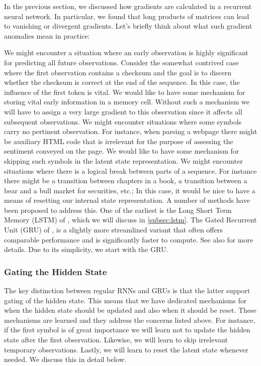 In the previous section, we discussed how gradients are calculated in a recurrent neural network. In particular, we found that long products of matrices can lead to vanishing or divergent gradients. Let’s briefly think about what such gradient anomalies mean in practice:

We might encounter a situation where an early observation is highly significant for predicting all future observations. Consider the somewhat contrived case where the first observation contains a checksum and the goal is to discern whether the checksum is correct at the end of the sequence. In this case, the influence of the first token is vital. We would like to have some mechanism for storing vital early information in a memory cell. Without such a mechanism we will have to assign a very large gradient to this observation since it affects all subsequent observations.
We might encounter situations where some symbols carry no pertinent observation. For instance, when parsing a webpage there might be auxiliary HTML code that is irrelevant for the purpose of assessing the sentiment conveyed on the page. We would like to have some mechanism for skipping such symbols in the latent state representation.
We might encounter situations where there is a logical break between parts of a sequence. For instance there might be a transition between chapters in a book, a transition between a bear and a bull market for securities, etc.; In this case, it would be nice to have a means of resetting our internal state representation.
A number of methods have been proposed to address this. One of the earliest is the Long Short Term Memory (LSTM) of \citep{Hochreiter1997}, which we will discuss in \cref{subsec:lstm}. The Gated Recurrent Unit (GRU) of \citet{Cho2014}, is a slightly more streamlined variant that often offers comparable performance and is significantly faster to compute. See also \citep{Chung2014} for more details. Due to its simplicity, we start with the GRU.

\subsubsection{Gating the Hidden State}

The key distinction between regular RNNs and GRUs is that the latter support gating of the hidden state. This means that we have dedicated mechanisms for when the hidden state should be updated and also when it should be reset. These mechanisms are learned and they address the concerns listed above. For instance, if the first symbol is of great importance we will learn not to update the hidden state after the first observation. Likewise, we will learn to skip irrelevant temporary observations. Lastly, we will learn to reset the latent state whenever needed. We discuss this in detail below.


